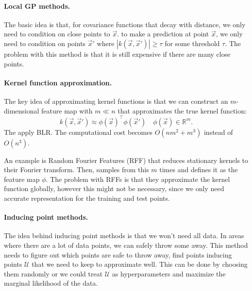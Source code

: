 \paragraph{Local GP methods.}

The basic idea is that, for covariance functions that decay with
distance, we only need to condition on close points to $\vec{x}$.
\Ie to make a prediction at point $\vec{x}$, we only need to condition on
points $\vec{x}'$ where $|k(\vec{x},\vec{x}')|\geq \tau$ for some threshold
$\tau$. The problem with this method is that it is still expensive if there
are many close points.

\paragraph{Kernel function approximation.}

The key idea of approximating kernel functions is that we can construct an
$m$-dimensional feature map with $m \ll n$ that approximates the true kernel
function: \[
  k(\vec{x},\vec{x}')\approx \phi(\vec{x})^\top\phi(\vec{x}') \hspace{1em} \phi(\vec{x})\in\mathbb{R}^m
.\]
The apply BLR. The computational cost becomes $O(nm^2 + m^3)$ instead of
$O(n^3)$.

An example is Random Fourier Features (RFF) that reduces stationary kernels
to their Fourier transform. Then, samples from this $m$ times and defines it
as the feature map $\phi$. The problem with RFFs is that they approximate the
kernel function globally, however this might not be necessary, since we only
need accurate representation for the training and test points.

\paragraph{Inducing point methods.}

The idea behind inducing point methods is that we won't need all data. In
areas where there are a lot of data points, we can safely throw some away.
This method needs to figure out which points are safe to throw away, \ie find
points inducing points $\mathcal{U}$ that we need to keep to approximate well.
This can be done by choosing them randomly or we could treat $\mathcal{U}$ as
hyperparameters and maximize the marginal likelihood of the data.
